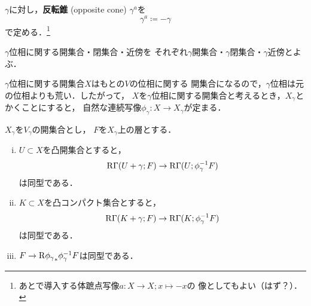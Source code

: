 \(\gamma\)に対し，\textbf{反転錐} (opposite cone) \(\gamma^a\)を
\[
    \gamma^a\coloneqq -\gamma
\]
で定める．\footnote{
    あとで導入する体蹠点写像\(a\colon X\to X;x\mapsto -x\)の
    像としてもよい（はず？）．
}

\(\gamma\)位相に関する開集合・閉集合・近傍を
それぞれ\(\gamma\)開集合・\(\gamma\)閉集合・\(\gamma\)近傍とよぶ．

\(\gamma\)位相に関する開集合\(X\)はもとの\(V\)の位相に関する
開集合になるので，\(\gamma\)位相は元の位相よりも荒い．したがって，
\(X\)を\(\gamma\)位相に関する開集合と考えるとき，\(X_\gamma\)と
かくことにすると，
自然な連続写像\(\phi_\gamma\colon X\to X_\gamma\)が定まる．



\begin{leftbar}
    \begin{PRP}\label{prp:353}
        \(X_\gamma\)を\(V_\gamma\)の開集合とし，
        \(F\)を\(X_\gamma\)上の層とする．
        \begin{enumerate}[(i)]
            \item \(U\subset X\)を凸開集合とすると，\[
                \mathop{\mathrm{R}\hspace{-0pt}\Gamma}\nolimits(U+\gamma;F)\to\mathop{\mathrm{R}\hspace{-0pt}\Gamma}\nolimits(U;\phi^{-1}_\gamma F)
            \]は同型である．\label{353-1}
            \item \(K\subset X\)を凸コンパクト集合とすると，\[
                \mathop{\mathrm{R}\hspace{-0pt}\Gamma}\nolimits(K+\gamma;F)\to\mathop{\mathrm{R}\hspace{-0pt}\Gamma}\nolimits(K;\phi^{-1}_\gamma F)
            \]は同型である．
            \item \(F\to \mathrm{R}{\phi_{\gamma}}_\ast\phi_{\gamma}^{-1}F\)は同型である．
        \end{enumerate}
    \end{PRP}
\end{leftbar}

